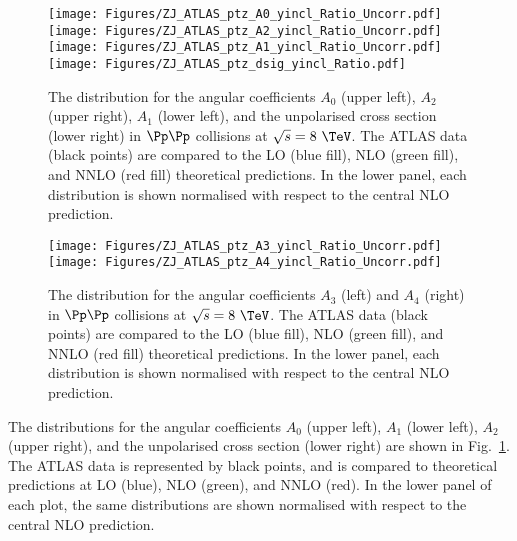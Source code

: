 \begin{figure}
\centering
\texttt{[image: Figures/ZJ\_ATLAS\_ptz\_A0\_yincl\_Ratio\_Uncorr.pdf]} \hfill
\texttt{[image: Figures/ZJ\_ATLAS\_ptz\_A2\_yincl\_Ratio\_Uncorr.pdf]} \\
\texttt{[image: Figures/ZJ\_ATLAS\_ptz\_A1\_yincl\_Ratio\_Uncorr.pdf]} \hfill
\texttt{[image: Figures/ZJ\_ATLAS\_ptz\_dsig\_yincl\_Ratio.pdf]} 
\caption{The \ptz distribution for the angular coefficients $A_0$ (upper left), $A_2$ (upper right), 
 $A_1$ (lower left), and the unpolarised cross section (lower right)  in $\Pp\Pp$ collisions at $\sqrt{s} = 8~\TeV$. 
 The ATLAS data (black points) are compared to the LO (blue fill), NLO (green fill), and NNLO (red fill)
 theoretical predictions. In the lower panel, each distribution is shown normalised 
 with respect to the central NLO prediction.
}
\label{fig:ATLAS_1}
\end{figure}
\begin{figure}
\centering
\texttt{[image: Figures/ZJ\_ATLAS\_ptz\_A3\_yincl\_Ratio\_Uncorr.pdf]} \hfill
\texttt{[image: Figures/ZJ\_ATLAS\_ptz\_A4\_yincl\_Ratio\_Uncorr.pdf]}
\caption{
The \ptz distribution for the angular coefficients $A_3$ (left) and $A_4$ (right) 
in $\Pp\Pp$ collisions at $\sqrt{s} = 8~\TeV$. The ATLAS data (black points) are 
compared to the LO (blue fill), NLO (green fill), and NNLO (red fill) 
theoretical predictions. In the lower panel, each distribution is shown normalised 
with respect to the central NLO prediction.
}
\label{fig:ATLAS_2}
\end{figure}

The \ptz distributions for the angular coefficients $A_0$ (upper left), $A_1$ (lower left), 
$A_2$ (upper right), and the unpolarised cross section (lower right) are shown in Fig.~\ref{fig:ATLAS_1}. 
The ATLAS data is represented by black points, and is compared to theoretical predictions at LO (blue), 
NLO (green), and NNLO (red). In the lower panel of each plot, the same distributions are shown normalised
with respect to the central NLO prediction.

